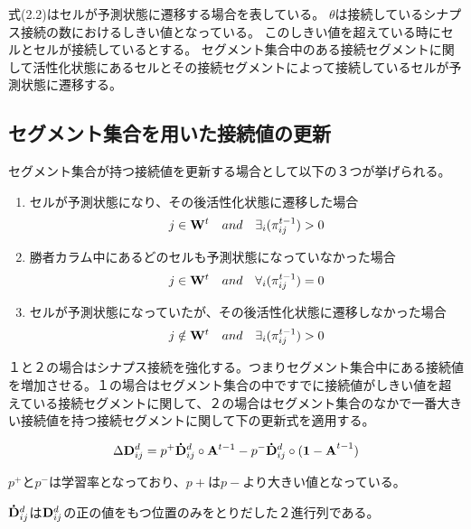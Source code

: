式(2.2)はセルが予測状態に遷移する場合を表している。
$\theta$は接続しているシナプス接続の数におけるしきい値となっている。
このしきい値を超えている時にセルとセルが接続しているとする。
セグメント集合中のある接続セグメントに関して活性化状態にあるセルとその接続セグメントによって接続しているセルが予測状態に遷移する。

\subsection{セグメント集合を用いた接続値の更新}

セグメント集合が持つ接続値を更新する場合として以下の３つが挙げられる。

\begin{enumerate}
  \item セルが予測状態になり、その後活性化状態に遷移した場合
  \begin{equation}
    j \in {\bf W}^ t \quad and \quad \exists_{i}(\pi^{t-1}_{ij}) > 0
  \end{equation}

  \item 勝者カラム中にあるどのセルも予測状態になっていなかった場合
  \begin{equation}
    j \in {\bf W}^t \quad and \quad \forall_{i}(\pi^{t-1}_{ij}) = 0
  \end{equation}

  \item セルが予測状態になっていたが、その後活性化状態に遷移しなかった場合
  \begin{equation}
    j \notin {\bf W}^ t \quad and \quad \exists_{i}(\pi^{t-1}_{ij}) > 0
  \end{equation}

\end{enumerate}

１と２の場合はシナプス接続を強化する。つまりセグメント集合中にある接続値を増加させる。１の場合はセグメント集合の中ですでに接続値がしきい値を超えている接続セグメントに関して、２の場合はセグメント集合のなかで一番大きい接続値を持つ接続セグメントに関して下の更新式を適用する。

\begin{equation}
  \Delta {\bf D}^d_{ij} = p^+{\bf \dot{D}}^d_{ij} \circ {\bf A}^{t-1} - p^-{\bf \dot{D}}^d_{ij} \circ {\bf (1 - A}^{t-1})
\end{equation}

$p^+$と$p^-$は学習率となっており、$p+$は$p-$より大きい値となっている。

${\bf \dot{D}}^d_{ij}$は${\bf D}^d_{ij}$の正の値をもつ位置のみをとりだした２進行列である。

